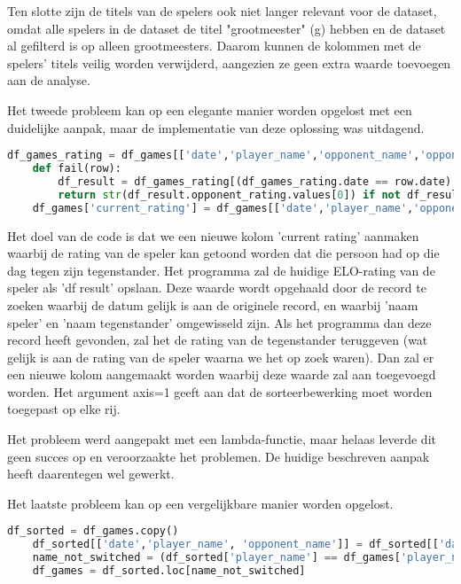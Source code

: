 Ten slotte zijn de titels van de spelers ook niet langer relevant voor de dataset, omdat alle spelers in de dataset de titel "grootmeester" (g) hebben en de dataset al gefilterd is op alleen grootmeesters. Daarom kunnen de kolommen met de spelers' titels veilig worden verwijderd, aangezien ze geen extra waarde toevoegen aan de analyse.

Het tweede probleem kan op een elegante manier worden opgelost met een duidelijke aanpak, maar de implementatie van deze oplossing was uitdagend.

\begin{lstlisting}[language=Python]
    df_games_rating = df_games[['date','player_name','opponent_name','opponent_rating']]
    def fail(row):
        df_result = df_games_rating[(df_games_rating.date == row.date) & (df_games_rating.player_name == row.opponent_name) & (df_games_rating.opponent_name == row.player_name)]
        return str(df_result.opponent_rating.values[0]) if not df_result.empty else ''
    df_games['current_rating'] = df_games[['date','player_name','opponent_name','opponent_rating']].apply(fail, axis=1)
\end{lstlisting}

Het doel van de code is dat we een nieuwe kolom 'current rating' aanmaken waarbij de rating van de speler kan getoond worden dat die persoon had op die dag tegen zijn tegenstander. Het programma zal de huidige ELO-rating van de speler als 'df result' opslaan. Deze waarde wordt opgehaald door de record te zoeken waarbij de datum gelijk is aan de originele record, en waarbij 'naam speler' en 'naam tegenstander' omgewisseld zijn. Als het programma dan deze record heeft gevonden, zal het de rating van de tegenstander teruggeven (wat gelijk is aan de rating van de speler waarna we het op zoek waren). Dan zal er een nieuwe kolom aangemaakt worden waarbij deze waarde zal aan toegevoegd worden. Het argument axis=1 geeft aan dat de sorteerbewerking moet worden toegepast op elke rij. 

Het probleem werd aangepakt met een lambda-functie, maar helaas leverde dit geen succes op en veroorzaakte het problemen. De huidige beschreven aanpak heeft daarentegen wel gewerkt.

Het laatste probleem kan op een vergelijkbare manier worden opgelost.

\begin{lstlisting}[language=Python]
    df_sorted = df_games.copy()
    df_sorted[['date','player_name', 'opponent_name']] = df_sorted[['date','player_name', 'opponent_name']].apply(sorted, axis=1, result_type='expand')
    name_not_switched = (df_sorted['player_name'] == df_games['player_name'])
    df_games = df_sorted.loc[name_not_switched]
\end{lstlisting}

